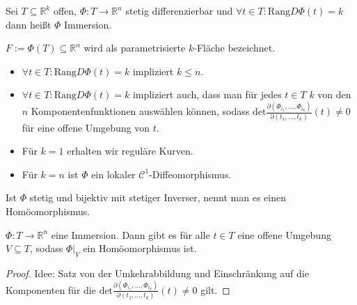 \begin{definition}[Immersion]
	Sei $T\subseteq \mathbb R^k$ offen, $\Phi:T\rightarrow \mathbb R^n$ stetig differenzierbar und $\forall t\in T: \text{Rang}D\Phi(t)=k$ dann hei\ss t $\Phi$ Immersion.
\end{definition}
\begin{definition}[k-Fl\"achen]
	$F:=\Phi(T)\subseteq \mathbb R^n$ wird als parametrisierte $k$-Fl\"ache bezeichnet.
\end{definition}

\begin{remark}\leavevmode
	\begin{itemize}
		\item $\forall t\in T: \text{Rang}D\Phi(t)=k$ impliziert $k\leq n$.
		\item $\forall t\in T: \text{Rang}D\Phi(t)=k$ impliziert auch, dass man f\"ur jedes $t\in T$ $k$ von den $n$ Komponentenfunktionen ausw\"ahlen k\"onnen, sodass $\text{det}\frac{\partial(\Phi_{i_1},\dots,\Phi_{i_k})}{\partial(t_1,\dots,t_k)}(t)\neq 0$ f\"ur eine offene Umgebung von $t$.
		\item F\"ur $k=1$ erhalten wir regul\"are Kurven.
		\item F\"ur $k=n$ ist $\Phi$ ein lokaler $\mathcal C^1$-Diffeomorphismus.
	\end{itemize}
\end{remark}
\begin{definition}
	Ist $\Phi$ stetig und bijektiv mit stetiger Inverser, nennt man es einen Hom\"oomorphismus.
\end{definition}

\begin{lemma}
	$\Phi:T \rightarrow \mathbb R^n$ eine Immersion. Dann gibt es f\"ur alle $t\in T$ eine offene Umgebung $V \subseteq T$, sodass $\Phi|_V$ ein Hom\"oomorphismus ist.
\end{lemma}
\begin{proof}
	Idee: Satz von der Umkehrabbildung und Einschr\"ankung auf die Komponenten f\"ur die $\text{det}\frac{\partial(\Phi_{i_1},\dots,\Phi_{i_k})}{\partial(t_1,\dots,t_k)}(t)\neq 0$ gilt.
\end{proof}



